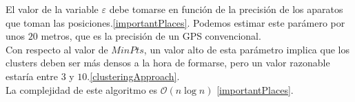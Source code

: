 \documentclass[a4paper, 12pt]{article}
\begin{document}
El valor de la variable $\varepsilon$ debe tomarse en funci\'on de la precisi\'on de los aparatos que toman las posiciones.\ref{importantPlaces}. Podemos estimar este par\'amero por unos $20$ metros, que es la precisi\'on de un GPS convencional. \\

Con respecto al valor de $MinPts$, un valor alto de esta par\'ametro implica que los clusters deben ser m\'as densos a la hora de formarse, pero un valor razonable estar\'ia entre $3$ y $10$.\ref{clusteringApproach}.\\

La complejidad de este algoritmo es $\mathcal{O}(n\log{}n)$ \ref{importantPlaces}. \\


%
%
%
%
%
%
%
%
%
%
%
%
\end{document}
